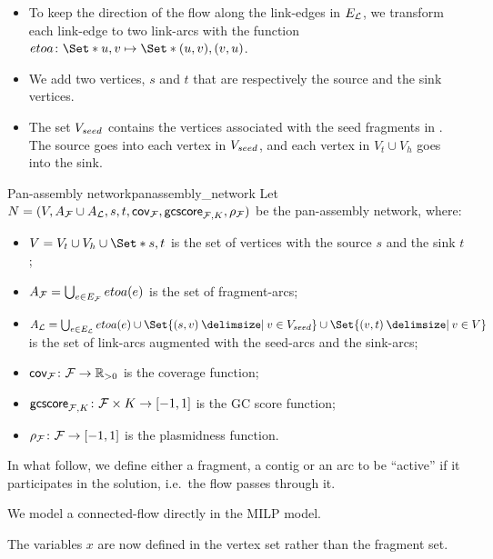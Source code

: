 \begin{itemize}
  \item To keep the direction of the flow along the link-edges in \(E_{\mathcal{L}}{}\), we transform each link-edge to two link-arcs with the function \(etoa \colon \Set*{u, v} \mapsto \Set*{(u, v), (v, u)}\).
  \item We add two vertices, \(s\) and \(t\) that are respectively the source and the sink vertices.
  \item The set \(V_{seed}{}\) contains the vertices associated with the seed fragments in \SeedFrags{}.
    The source goes into each vertex in \(V_{seed}{}\), and each vertex in \(V_t \cup V_h\) goes into the sink.
\end{itemize}

\begin{definition}{Pan-assembly network}{panassembly_network}
  Let \(N = (V, A_{\mathcal{F}}{} \cup A_{\mathcal{L}}{}, s, t, \mathsf{cov}_{\mathcal{F}{}}, \mathsf{gcscore}_{\mathcal{F}{}, K}, \rho_{\mathcal{F}{}})\) be the pan-assembly network, where:

  \begin{itemize}
    \item \(V = V_t \cup V_h \cup \Set*{s, t}\) is the set of vertices with the source \(s\) and the sink \(t\);
    \item \(A_{\mathcal{F}}{} = \bigcup_{e \in E_{\mathcal{F}}{}} etoa(e)\) is the set of fragment-arcs;
    \item \(A_\Links{} = \bigcup_{e \in E_\Links{}} etoa(e) \cup \Set{(s, v) \given v \in \VSeed{}} \cup \Set{(v, t) \given v \in V}\) is the set of link-arcs augmented with the seed-arcs and the sink-arcs;
    \item \(\mathsf{cov}_{\mathcal{F}{}} \colon \mathcal{F}{} \to \mathbb{R}{}_{> 0}\) is the coverage function;
    \item \(\mathsf{gcscore}_{\mathcal{F}{}, K} \colon \mathcal{F}{} \times K \to [-1, 1]\) is the GC score function;
    \item \(\rho_{\mathcal{F}{}} \colon \mathcal{F}{} \to [-1, 1]\) is the plasmidness function.
  \end{itemize}
\end{definition}

In what follow, we define either a fragment, a contig or an arc to be \enquote{active} if it participates in the solution, i.e.\ the flow passes through it.

\begin{newfeatbox}
  We model a connected-flow directly in the MILP model.

  \begin{notebox}
    The variables \(x\) are now defined in the vertex set rather than the fragment set.
  \end{notebox}
\end{newfeatbox}

